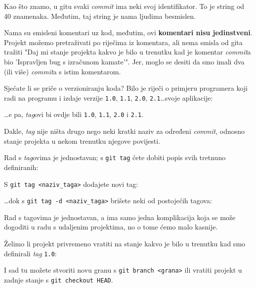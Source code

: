 Kao što znamo, u gitu svaki \emph{commit} ima neki svoj identifikator. 
To je string od 40 znamenaka.
Međutim, taj string je nama ljudima besmislen.

Nama su smisleni komentari uz kod, međutim, ovi \textbf{komentari nisu jedinstveni}.
Projekt možemo pretraživati po riječima iz komentara, ali nema smisla od gita tražiti "Daj mi stanje projekta kakvo je bilo u trenutku kad je komentar \emph{commit}a bio 'Ispravljen bug s izračunom kamate'".
Jer, moglo se desiti da smo imali dva (ili više) \emph{commit}a s istim komentarom.

Sjećate li se priče o verzioniranju koda?
Bilo je riječi o primjeru programera koji radi na programu i izdaje verzije \verb+1.0+, \verb+1.1+, \verb+2.0+, \verb+2.1+\dots svoje aplikacije:



\dots{}e pa, \emph{tag}ovi bi ovdje bili \verb+1.0+, \verb+1.1+, \verb+2.0+ i \verb+2.1+.

Dakle, \emph{tag} nije ništa drugo nego neki kratki naziv za određeni \emph{commit}, odnosno stanje projekta u nekom trenutku njegove povijesti.

Rad s \emph{tag}ovima je jednostavan; s \verb+git tag+ ćete dobiti popis svih tretnuno definiranih:



S \verb+git tag <naziv_taga>+ dodajete novi tag:


\dots{}dok s \verb+git tag -d <naziv_taga>+ brišete neki od postojećih tagova:


Rad s tagovima je jednostavan, a ima samo jedna komplikacija koja se može dogoditi u radu s udaljenim projektima, no o tome ćemo malo kasnije.

Želimo li projekt privremeno vratiti na stanje kakvo je bilo u trenutku kad smo definirali \emph{tag} \verb+1.0+:


I sad tu možete stvoriti novu granu s \verb+git branch <grana>+ ili vratiti projekt u zadnje stanje s \verb+git checkout HEAD+.
